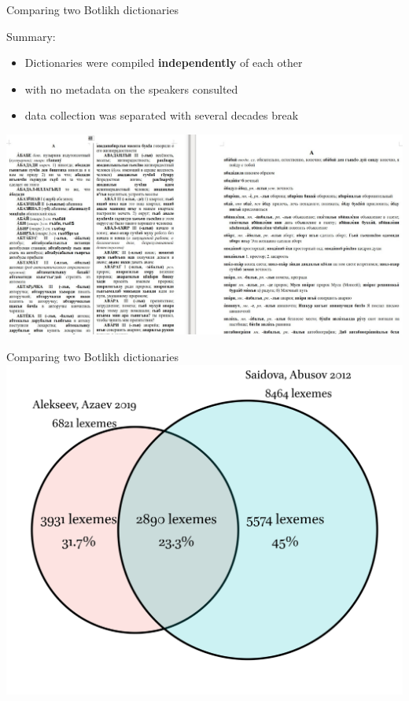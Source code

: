 \documentclass[13pt, t]{beamer}
\begin{document}
\begin{frame}{Comparing two Botlikh dictionaries}
\begin{block}{Summary:}
\begin{itemize}
\item Dictionaries were compiled \textbf{independently} of each other 
\item with no metadata on the speakers consulted 
\item data collection was separated with several decades break
\end{itemize}
\end{block}
\includegraphics[width=\linewidth]{images/05_dicts}
\end{frame}


\begin{frame}{Comparing two Botlikh dictionaries}
\includegraphics[width=0.94\linewidth]{images/03_venn}
\end{frame}
\end{document}
